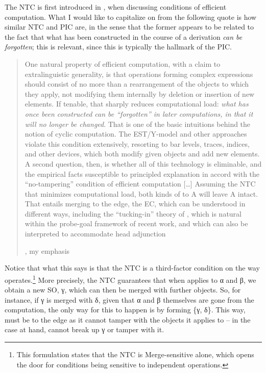 \documentclass[output=paper]{langsci/langscibook}
\begin{document}
The \gls{NTC} is first introduced in \citet{Chomsky2005}, when discussing
conditions of efficient computation. What I would like to capitalize on from
the following quote is how similar \gls{NTC} and \gls{PIC} are, in the sense
that the former appears to be related to the fact that what has been
constructed in the course of a derivation \emph{can be forgotten}; this is
relevant, since this is typically the hallmark of the \gls{PIC}.

\blockquote[{\citealt[11, 13]{Chomsky2005}, my emphasis}][.]{One natural
    property of efficient computation, with a claim to extralinguistic
    generality, is that operations forming complex expressions should consist
    of no more than a rearrangement of the objects to which they apply, not
    modifying them internally by deletion or insertion of new elements. If
    tenable, that sharply reduces computational load: \emph{what has once
    been constructed can be ``forgotten'' in later computations, in that it
will no longer be changed}.  That is one of the basic intuitions behind the
notion of cyclic computation.  The \gls{EST}/Y-model and other
approaches violate this condition extensively, resorting to bar levels, traces,
indices, and other devices, which both modify given objects and add new
elements. A second question, then, is whether all of this technology is
eliminable, and the empirical facts susceptible to principled explanation in
accord with the ``no-tampering'' condition of efficient computation [\dots]
Assuming the \gls{NTC} that minimizes computational load, both kinds of 
to A will leave A intact. That entails merging to the edge, the \gls{EC}, which
can be understood in different ways, including the ``tucking-in'' theory of
\textcite{Richards1997}, which is natural within the probe-goal framework of
recent work, and which can also be interpreted to accommodate head
adjunction}

Notice that what this says is that the \gls{NTC} is a third-factor condition on the
way  operates.\footnote{This formulation states that the \gls{NTC} is
Merge-sensitive alone, which opens the door for conditions being sensitive to
independent operations.}  More precisely, the \gls{NTC} guarantees that when 
applies to α and β, we obtain a new \gls{SO}, γ, which can
then be merged with further objects. So, for instance, if γ is merged
with δ, given that α and β themselves are gone from
the computation, the only way for this to happen is by forming \{γ, δ\}. This
way,  must be to the edge as it cannot tamper with the objects it
applies to -- in the case at hand,  cannot break up γ or tamper with
it.
\end{document}
